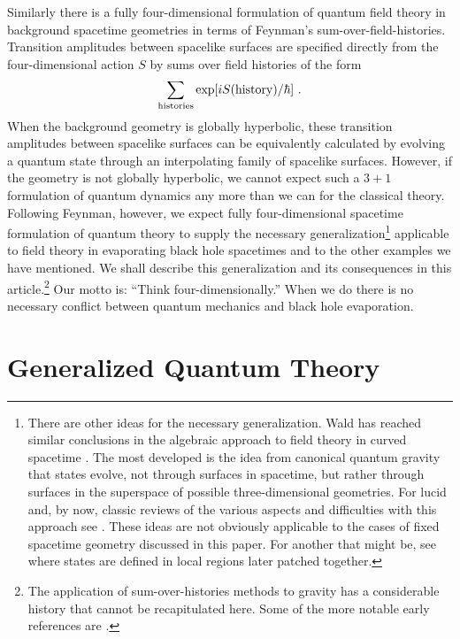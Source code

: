 Similarly there is a fully four-dimensional formulation of quantum field theory
in background spacetime geometries in terms of Feynman's
sum-over-field-histories.  Transition amplitudes between spacelike
surfaces are specified directly from the four-dimensional action $S$ by
sums over field histories of the form
\begin{equation}
\sum\limits_{\rm histories} \exp[iS({\rm history})/\hbar]\ .
\label{fourone}
\end{equation}
When the background geometry is globally hyperbolic, these transition
amplitudes between spacelike surfaces can be equivalently calculated by
evolving a quantum state through an interpolating family of spacelike surfaces.
However, if the geometry is not globally  hyperbolic, 
we cannot expect such a $3+1$ formulation of
quantum dynamics any more than we can for the classical theory.
Following
Feynman, however, we expect fully four-dimensional spacetime formulation
of quantum theory to supply the necessary generalization\footnote{There
are other ideas for the necessary generalization. Wald has reached
similar conclusions in the algebraic approach to field theory in curved
spacetime \cite{Wal94}. The most developed is
the idea from canonical quantum gravity that states 
evolve, not through surfaces in spacetime, but rather through surfaces
in the superspace of possible three-dimensional geometries.  For lucid
and, by now, classic reviews of the various aspects and difficulties
with this approach see \cite{POT}.
These ideas are not obviously applicable to the cases of fixed spacetime
geometry discussed in this paper.  For another that might be, see
\cite{Deu91} where states are defined in local
regions later patched together.} applicable to field theory in
evaporating black hole spacetimes and to the other examples we have
mentioned.  We shall describe this
generalization and its consequences in this article.\footnote{The
application of sum-over-histories methods to gravity has a considerable
history that cannot be recapitulated here.  Some of the more notable
early references are \cite{SOHQG}.}
Our motto is: ``Think four-dimensionally.''
When we do there is no necessary conflict between
quantum mechanics and black hole evaporation.


\section{Generalized Quantum Theory}


